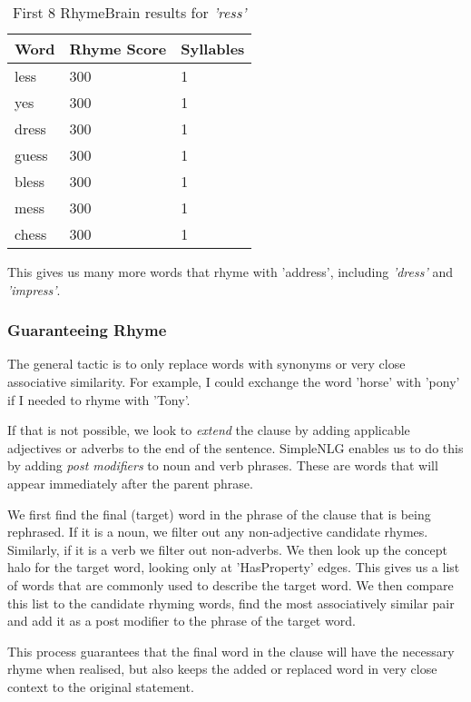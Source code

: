 \begin{table}
    \begin{tabular}{|l|l|l|}
    \hline
    Word  & Rhyme Score & Syllables \\ \hline
    less  & 300         & 1         \\ \hline
    yes   & 300         & 1         \\ \hline
    dress & 300         & 1         \\ \hline
    guess & 300         & 1         \\ \hline
    bless & 300         & 1         \\ \hline
    mess  & 300         & 1         \\ \hline
    chess & 300         & 1         \\ \hline
    \end{tabular}
\caption{First 8 RhymeBrain results for \textit{'ress'}}
\label{tab:ress-rb}
\end{table}

This gives us many more words that rhyme with 'address', including \textit{'dress'} and \textit{'impress'}.

\subsubsection{Guaranteeing Rhyme}

The general tactic is to only replace words with synonyms or very close associative similarity. For example, I could exchange the word 'horse' with 'pony' if I needed to rhyme with 'Tony'. 

If that is not possible, we look to \textit{extend} the clause by adding applicable adjectives or adverbs to the end of the sentence. SimpleNLG enables us to do this by adding \textit{post modifiers} to noun and verb phrases. These are words that will appear immediately after the parent phrase.

We first find the final (target) word in the phrase of the clause that is being rephrased. If it is a noun, we filter out any non-adjective candidate rhymes. Similarly, if it is a verb we filter out non-adverbs. We then look up the concept halo for the target word, looking only at 'HasProperty' edges. This gives us a list of words that are commonly used to describe the target word. We then compare this list to the candidate rhyming words, find the most associatively similar pair and add it as a post modifier to the phrase of the target word.

This process guarantees that the final word in the clause will have the necessary rhyme when realised, but also keeps the added or replaced word in very close context to the original statement.



